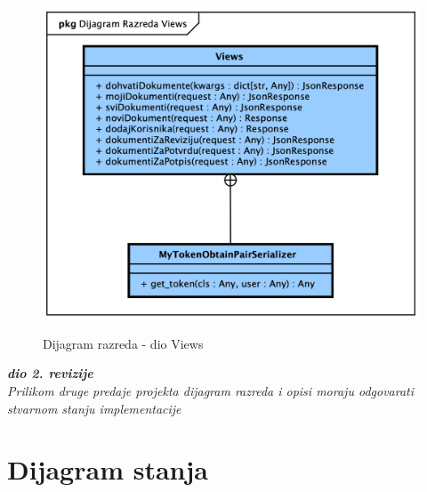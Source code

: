 			\begin{figure}[H]
				\
				\includegraphics[width=\textwidth]{slike/Class_Views.png}
				\caption{Dijagram razreda - dio Views}
				\label{fig:class_views}
			\end{figure}

			\textbf{\textit{dio 2. revizije}}\\			
			
			\textit{Prilikom druge predaje projekta dijagram razreda i opisi moraju odgovarati stvarnom stanju implementacije}
			
			
			
			\eject
		
		\section{Dijagram stanja}
			
